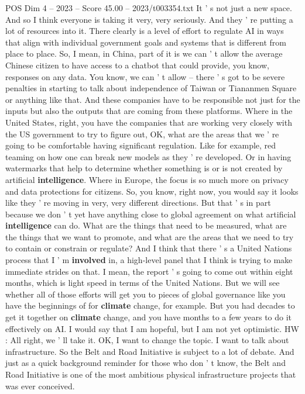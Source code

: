 \begin{textsample}{POS Dim 4 – 2023 – Score 45.00 – 2023/t003354.txt}
It ' s not just a new space.
And so I think everyone is taking it very, very seriously.
And they ' re putting a lot of resources into it.
There clearly is a level of effort to regulate AI in ways that align with individual government goals and systems that is different from place to place.
So, I mean, in China, part of it is we can ' t allow the average Chinese citizen to have access to a chatbot that could provide, you know, responses on any data.
You know, we can ' t allow -- there ' s got to be severe penalties in starting to talk about independence of Taiwan or Tiananmen Square or anything like that.
And these companies have to be responsible not just for the inputs but also the outputs that are coming from these platforms.
Where in the United States, right, you have the companies that are working very closely with the US government to try to figure out, OK, what are the areas that we ' re going to be comfortable having significant regulation.
Like for example, red teaming on how one can break new models as they ' re developed.
Or in having watermarks that help to determine whether something is or is not created by artificial \textbf{intelligence}.
Where in Europe, the focus is so much more on privacy and data protections for citizens.
So, you know, right now, you would say it looks like they ' re moving in very, very different directions.
But that ' s in part because we don ' t yet have anything close to global agreement on what artificial \textbf{intelligence} can do.
What are the things that need to be measured, what are the things that we want to promote, and what are the areas that we need to try to contain or constrain or regulate?
And I think that there ' s a United Nations process that I ' m \textbf{involved} in, a high-level panel that I think is trying to make immediate strides on that.
I mean, the report ' s going to come out within eight months, which is light speed in terms of the United Nations.
But we will see whether all of those efforts will get you to pieces of global governance like you have the beginnings of for \textbf{climate} change, for example.
But you had decades to get it together on \textbf{climate} change, and you have months to a few years to do it effectively on AI.
I would say that I am hopeful, but I am not yet optimistic.
HW : All right, we ' ll take it.
OK, I want to change the topic.
I want to talk about infrastructure.
So the Belt and Road Initiative is subject to a lot of debate.
And just as a quick background reminder for those who don ' t know, the Belt and Road Initiative is one of the most ambitious physical infrastructure projects that was ever conceived.

\end{textsample}
